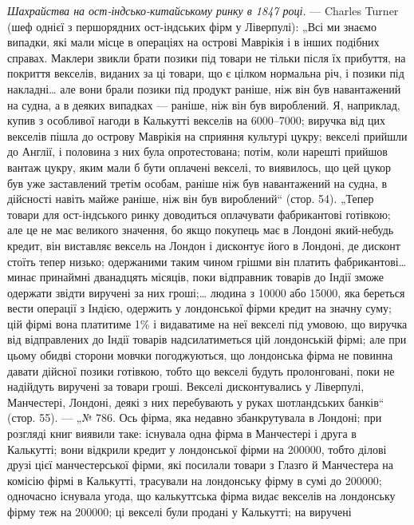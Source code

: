 \emph{Шахрайства на ост-індсько-китайському ринку в 1847 році.} — Charles
Turner (шеф однієї з першорядних ост-індських фірм у Ліверпулі): „Всі ми
знаємо випадки, які мали місце в операціях на острові Маврікія і в інших
подібних справах. Маклери звикли брати позики під товари не тільки після
їх прибуття, на покриття векселів, виданих за ці товари, що є цілком нормальна річ, і позики під
накладні\dots{} але вони брали позики під продукт раніше,
ніж він був навантажений на судна, а в деяких випадках — раніше, ніж він був
вироблений. Я, наприклад, купив з особливої нагоди в Калькутті векселів на 6000--7000; виручка від цих векселів пішла до острову Маврікія
на сприяння культурі цукру; векселі прийшли до Англії, і половина з них була
опротестована; потім, коли нарешті прийшов вантаж цукру, яким мали б бути
оплачені векселі, то виявилось, що цей цукор був уже заставлений третім особам,
раніше ніж був навантажений на судна, в дійсності навіть майже раніше, ніж він
був вироблений“ (стор. 54). „Тепер товари для ост-індського ринку доводиться
оплачувати фабрикантові готівкою; але це не має великого значення, бо якщо покупець має в Лондоні
який-небудь кредит, він виставляє вексель на Лондон
і дисконтує його в Лондоні, де дисконт стоїть тепер низько; одержаними таким
чином грішми він платить фабрикантові\dots{} минає принаймні дванадцять місяців,
поки відправник товарів до Індії зможе одержати звідти виручені за них гроші;\dots{}
людина з \num{10000} або \num{15000}, яка береться вести операції з Індією, одержить у
лондонської фірми кредит на значну суму; цій фірмі вона платитиме 1\% і видаватиме на неї векселі під
умовою, що виручка від відправлених до
Індії товарів надсилатиметься цій лондонській фірмі; але при цьому обидві сторони мовчки
погоджуються, що лондонська фірма не повинна давати дійсної
позики готівкою, тобто що векселі будуть пролонговані, поки не надійдуть виручені за товари гроші.
Векселі дисконтувались у Ліверпулі, Манчестері, Лондоні, деякі з них перебувають у руках
шотландських банків“ (стор. 55). — „№ 786.
Ось фірма, яка недавно збанкрутувала в Лондоні; при розгляді книг виявили таке:
існувала одна фірма в Манчестері і друга в Калькутті; вони відкрили кредит
у лондонської фірми на \num{200000}, тобто ділові друзі цієї манчестерської фірми, які
посилали товари з Глазго й Манчестера на комісію фірмі в Калькутті, трасували на лондонську фірму в
сумі до \num{200000}; одночасно існувала угода, що калькуттська фірма видає векселів на
лондонську фірму теж на \num{200000}; ці векселі були продані у Калькутті; на виручені
